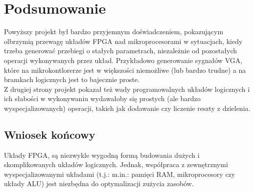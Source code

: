 \section{Podsumowanie}
    \tab Powyższy projekt był bardzo przyjemnym doświadczeniem, 
    pokazującym olbrzymią przewagę układów FPGA nad mikroprocesorami
    w sytuacjach, kiedy trzeba generować przebiegi o stałych parametrach,
    niezależnie od pozostałych operacji wykonywanych przez układ.
    Przykładowo generowanie sygnałów VGA, które na mikrokontlorerze jest w większości niemożliwe (lub bardzo trudne) a na bramkach logicznych jest to bajecznie proste.\\
    Z drugiej strony projekt pokazał też wady programowalnych układów logicznych i ich słabości w wykonywaniu
    wydawałoby się prostych (ale bardzo wyspecjalizowanych) operacji, takich jak dodawanie czy liczenie reszty z dzielenia.

    \subsection*{Wniosek końcowy}
        \tab Układy FPGA, są niezwykle wygodną formą budowania dużych 
        i skomplikowanych układów logicznych. 
        Jednak, współpraca z zewnętrznymi wyspecjalizowanymi układami 
        (t.j.: m.in.: pamięci RAM, mikroprocesory czy układy ALU) 
        jest niezbędna do optymalizacji zużycia zasobów.
